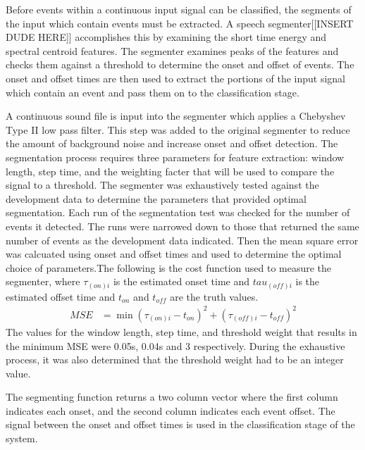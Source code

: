 Before events within a continuous input signal can be classified, the segments of the input which contain events must be extracted. A speech segmenter[[INSERT DUDE HERE]] accomplishes this by examining the short time energy and spectral centroid features.  The segmenter examines peaks of the features and checks them against a threshold to determine the onset and offset of events. The onset and offset times are then used to extract the portions of the input signal which contain an event and pass them on to the classification stage. 

A continuous sound file is input into the segmenter which  applies a Chebyshev Type II low pass filter. This step was added to the original segmenter to reduce the amount of background noise and increase onset and offset detection. The segmentation process requires three parameters for feature extraction: window length, step time, and the weighting facter that will be used to compare the signal to a threshold. The segmenter was exhaustively tested against the development data to determine the parameters that provided optimal segmentation. Each run of the segmentation test was checked for the number of events it detected. The runs were narrowed down to those that returned the same number of events as the development data indicated. Then the mean square error was calcuated using onset and offset times and used to determine the optimal choice of parameters.The following is the cost function used to measure the segmenter, where $\tau_{(on)i}$ is the estimated onset time and $tau_{(off)i}$ is the estimated offset time and $t_{on}$ and $t_{off}$ are the truth values.
\begin{align}
{MSE} &=\min{ (\tau_{(on)i}-t_{on} )^2 + (\tau_{(off)i}-t_{off})^2  }
\end{align}
The values for the window length, step time, and threshold weight that results in the minimum MSE were 0.05s, 0.04s and 3 respectively. During the exhaustive process, it was also determined that the threshold weight had to be an integer value. 

The segmenting function returns a two column vector where the first column indicates each onset, and the second column indicates each event offset. The signal between the onset and offset times is used in the classification stage of the system. 